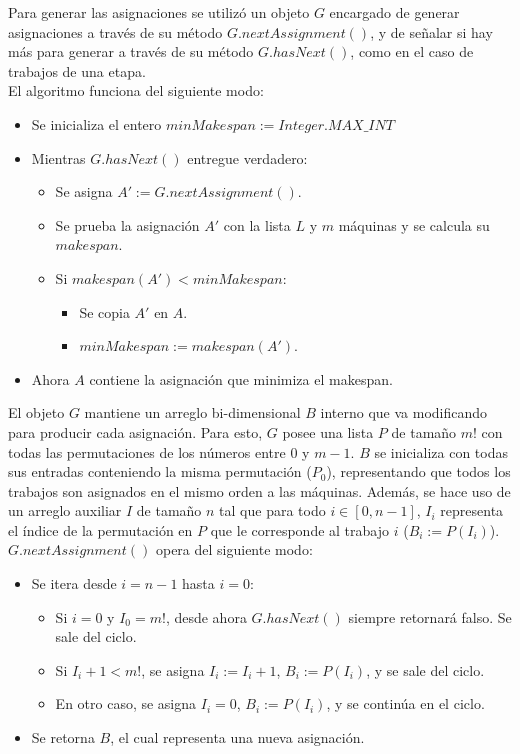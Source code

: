 \documentclass[12pt,letterpaper]{article}
\begin{document}
Para generar las asignaciones se utilizó un objeto $G$ encargado de generar asignaciones a través de su método $G.nextAssignment()$, y de señalar si hay más para generar a través de su método $G.hasNext()$, como en el caso de trabajos de una etapa.\\

El algoritmo funciona del siguiente modo:

\begin{itemize}
\item Se inicializa el entero $minMakespan := Integer.MAX\_INT$
\item Mientras $G.hasNext()$ entregue verdadero:
	\begin{itemize}
	\item Se asigna $A' := G.nextAssignment()$.
	\item Se prueba la asignación $A'$ con la lista $L$ y $m$ máquinas y se calcula su $makespan$.
	\item Si $makespan(A') < minMakespan$:
		\begin{itemize}
		\item Se copia $A'$ en $A$. 
		\item $minMakespan := makespan(A')$.
		\end{itemize}
	\end{itemize}
\item Ahora $A$ contiene la asignación que minimiza el makespan.
\end{itemize}

	 El objeto $G$ mantiene un arreglo bi-dimensional $B$ interno que va modificando para producir cada asignación. Para esto, $G$ posee una lista $P$ de tamaño $m!$ con todas las permutaciones de los números entre $0$ y $m-1$. $B$ se inicializa con todas sus entradas conteniendo la misma permutación ($P_{0}$), representando que todos los trabajos son asignados en el mismo orden a las máquinas. Además, se hace uso de un arreglo auxiliar $I$ de tamaño $n$ tal que para todo $i \in [0,n-1]$, $I_{i}$ representa el índice de la permutación en $P$ que le corresponde al trabajo $i$ ($B_{i} := P(I_{i})$). \\
	 
$G.nextAssignment()$ opera del siguiente modo:

\begin{itemize}
\item Se itera desde $i = n-1$ hasta $i = 0$:
	\begin{itemize}
	\item Si $i = 0$ y $I_{0} = m!$, desde ahora $G.hasNext()$ siempre retornará falso. Se sale del ciclo.
	\item Si $I_{i} + 1 < m!$, se asigna $I_{i} := I_{i} + 1$, $B_{i} := P(I_{i})$, y se sale del ciclo.
	\item En otro caso, se asigna $I_{i} = 0$, $B_{i} := P(I_{i})$, y se continúa en el ciclo.
	\end{itemize}
\item Se retorna $B$, el cual representa una nueva asignación.
\end{itemize}
\end{document}
